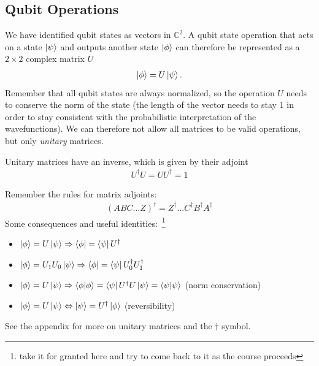 \subsection{Qubit Operations}
We have identified qubit states as vectors in $\mathbb{C}^2$. A qubit state operation that acts on a state $\ket{\psi}$ and outputs another state $\ket{\phi}$ can therefore be represented as a $2\times2$ complex matrix $U$
\begin{align}
    \ket{\phi} = U\ket{\psi}.
\end{align}
Remember that all qubit states are always normalized, so the operation $U$ needs to conserve the norm of the state (the length of the vector needs to stay 1 in order to stay consistent with the probabilistic interpretation of the wavefunctions). We can therefore not allow all matrices to be valid operations, but only \textit{unitary} matrices. 
\begin{def*}
Unitary matrices have an inverse, which is given by their adjoint
\begin{align}
    U^\dagger U = U U^\dagger = 1
\end{align}    
\end{def*}


\begin{highlight}
Remember the rules for matrix adjoints:
\begin{align}
    (ABC\dots Z)^\dagger = Z^\dagger\dots C^\dagger B^\dagger A^\dagger
\end{align}    
Some consequences and useful identities:~\footnote{take it for granted here and try to come back to it as the course proceeds}
\begin{itemize}
    \item $\ket{\phi} = U\ket{\psi} \Rightarrow \bra{\phi} = \bra{\psi}U^\dagger$
    \item $\ket{\phi} = U_1 U_0 \ket{\psi} \Rightarrow \bra{\phi} = \bra{\psi} U_0^\dagger U_1^\dagger$
    \item $\ket{\phi} = U \ket{\psi} \Rightarrow \braket{\phi}{\phi} = \bra{\psi}U^\dagger U\ket{\psi} = \braket{\psi}{\psi} $ (norm conservation)
    \item $\ket{\phi} = U \ket{\psi} \Leftrightarrow \ket{\psi} = U^\dagger \ket{\phi}$ (reversibility)
\end{itemize}
\end{highlight}
See the appendix for more on unitary matrices and the $\dagger$ symbol.

